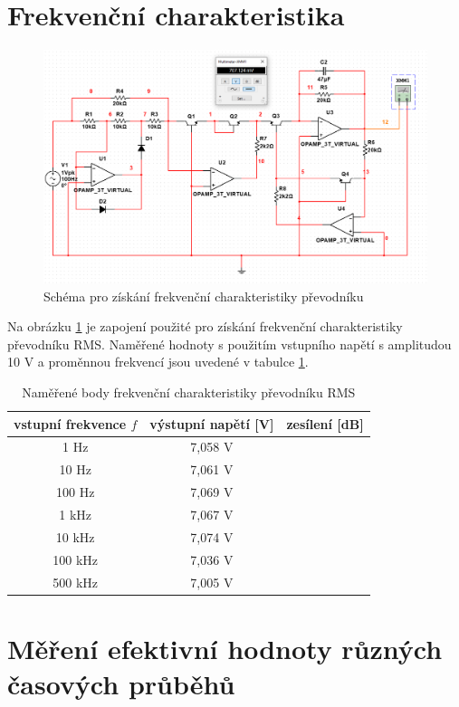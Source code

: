 \documentclass[twoside]{article}
\begin{document}
\section{Frekvenční charakteristika}

\begin{figure}[h!]
    \centering
    \includegraphics[width=0.8\linewidth]{frek_char_schema.png}
    \caption{Schéma pro získání frekvenční charakteristiky převodníku}
    \label{fig:schema_frek_char}
\end{figure}

Na obrázku \ref{fig:schema_frek_char} je zapojení použité pro získání frekvenční charakteristiky převodníku RMS.
Naměřené hodnoty s použitím vstupního napětí s amplitudou 10 V a proměnnou frekvencí 
jsou uvedené v tabulce \ref{tab:frek_char}.

\begin{table}
    \centering\begin{tabular}{c|c|c}
        vstupní frekvence $f$ & výstupní napětí [V] & zesílení [dB] \\\hline
        1 Hz & 7,058 V & \\
        10 Hz & 7,061 V & \\
        100 Hz & 7,069 V & \\
        1 kHz & 7,067 V & \\
        10 kHz & 7,074 V & \\
        100 kHz & 7,036 V & \\
        500 kHz & 7,005 V & \\
    \end{tabular}
    \caption{Naměřené body frekvenční charakteristiky převodníku RMS}
    \label{tab:frek_char}
\end{table}



\section{Měření efektivní hodnoty různých časových průběhů}
\end{document}
